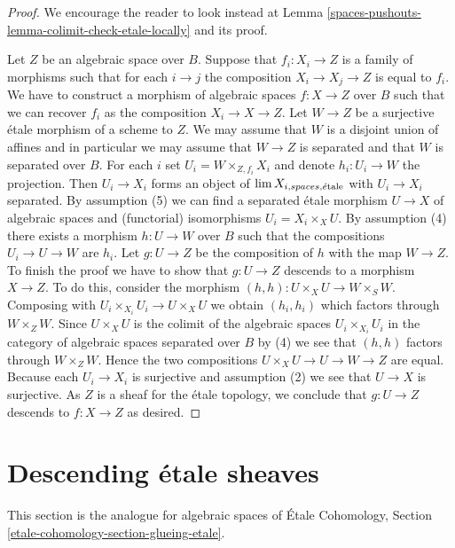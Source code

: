 \begin{proof}
We encourage the reader to look instead at
Lemma \ref{spaces-pushouts-lemma-colimit-check-etale-locally}
and its proof.

\medskip\noindent
Let $Z$ be an algebraic space over $B$. Suppose that $f_i : X_i \to Z$ is
a family of morphisms such that for each $i \to j$ the composition
$X_i \to X_j \to Z$ is equal to $f_i$. We have to construct a morphism
of algebraic spaces $f : X \to Z$ over $B$ such that we can recover $f_i$ as
the composition $X_i \to X \to Z$. Let $W \to Z$ be a surjective
\'etale morphism of a scheme to $Z$. We may assume that $W$ is a
disjoint union of affines and in particular we may assume that
$W \to Z$ is separated and that $W$ is separated over $B$. For each $i$ set
$U_i = W \times_{Z, f_i} X_i$ and denote $h_i : U_i \to W$ the projection.
Then $U_i \to X_i$ forms an object of $\lim X_{i, spaces, \acute{e}\text{tale}}$
with $U_i \to X_i$ separated. By
assumption (5) we can find a separated \'etale morphism $U \to X$
of algebraic spaces and (functorial) isomorphisms $U_i = X_i \times_X U$.
By assumption (4) there exists a morphism $h : U \to W$ over $B$
such that the compositions $U_i \to U \to W$ are $h_i$.
Let $g : U \to Z$ be the composition of $h$ with the map $W \to Z$. To
finish the proof we have to show that $g : U \to Z$
descends to a morphism $X \to Z$. To do this, consider the morphism
$(h, h) : U \times_X U \to W \times_S W$.
Composing with $U_i \times_{X_i} U_i \to U \times_X U$ we obtain
$(h_i, h_i)$ which factors through $W \times_Z W$. Since $U \times_X U$
is the colimit of the algebraic spaces $U_i \times_{X_i} U_i$
in the category of algebraic spaces separated over $B$ by (4) we see
that $(h, h)$ factors through $W \times_Z W$. Hence the two compositions
$U \times_X U \to U \to W \to Z$ are equal. Because each $U_i \to X_i$ is
surjective and assumption (2) we see that $U \to X$ is surjective.
As $Z$ is a sheaf for the \'etale topology, we conclude that
$g : U \to Z$ descends to $f : X \to Z$ as desired.
\end{proof}

\section{Descending \'etale sheaves}
\label{spaces-pushouts-section-glueing-etale}
This section is the analogue for algebraic spaces of
\'Etale Cohomology, Section \ref{etale-cohomology-section-glueing-etale}.

